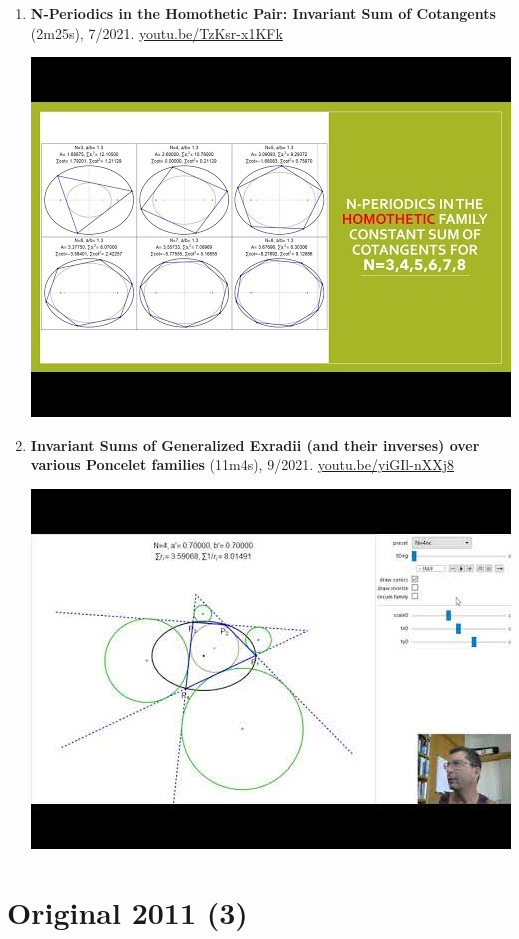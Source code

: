 \documentclass[12pt]{article}
\begin{document}
\begin{enumerate}[resume]
% 
\item \textbf{N-Periodics in the Homothetic Pair: Invariant Sum of Cotangents} (2m25s), 7/2021. \href{https://youtu.be/TzKsr-x1KFk}{\url{youtu.be/TzKsr-x1KFk}}
\begin{center}\includegraphics[width=.5\textwidth]{pics/TzKsr-x1KFk.jpg}\end{center}
% 
\item \textbf{Invariant Sums of Generalized Exradii (and their inverses) over various Poncelet families} (11m4s), 9/2021. \href{https://youtu.be/yiGIl-nXXj8}{\url{youtu.be/yiGIl-nXXj8}}
\begin{center}\includegraphics[width=.5\textwidth]{pics/yiGIl-nXXj8.jpg}\end{center}
% 
\end{enumerate}

\section{Original 2011 (3)}
\end{document}
